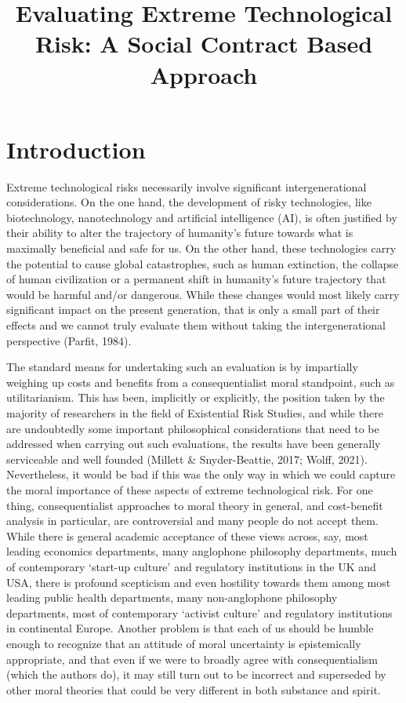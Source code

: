 \documentclass[man,11pt,a4paper]{apa7}
\title{Evaluating Extreme Technological Risk: A Social Contract Based Approach}
\begin{document}
\maketitle
\makeatletter
\renewcommand\@makefntext[1]{\linespread{1}\selectfont\raggedright\textsuperscript{\@thefnmark}~#1}
\makeatother

\section{Introduction}

Extreme technological risks necessarily involve significant intergenerational considerations. On the one hand, the development of risky technologies, like biotechnology, nanotechnology and artificial intelligence (AI), is often justified by their ability to alter the trajectory of humanity's future towards what is maximally beneficial and safe for us. On the other hand, these technologies carry the potential to cause global catastrophes, such as human extinction, the collapse of human civilization or a permanent shift in humanity's future trajectory that would be harmful and/or dangerous. While these changes would most likely carry significant impact on the present generation, that is only a small part of their effects and we cannot truly evaluate them without taking the intergenerational perspective (Parfit, 1984).

The standard means for undertaking such an evaluation is by impartially weighing up costs and benefits from a consequentialist moral standpoint, such as utilitarianism. This has been, implicitly or explicitly, the position taken by the majority of researchers in the field of Existential Risk Studies, and while there are undoubtedly some important philosophical considerations that need to be addressed when carrying out such evaluations, the results have been generally serviceable and well founded (Millett \& Snyder-Beattie, 2017; Wolff, 2021). Nevertheless, it would be bad if this was the only way in which we could capture the moral importance of these aspects of extreme technological risk. For one thing, consequentialist approaches to moral theory in general, and cost-benefit analysis in particular, are controversial and many people do not accept them. While there is general academic acceptance of these views across, say, most leading economics departments, many anglophone philosophy departments, much of contemporary `start-up culture' and regulatory institutions in the UK and USA, there is profound scepticism and even hostility towards them among most leading public health departments, many non-anglophone philosophy departments, most of contemporary `activist culture' and regulatory institutions in continental Europe. Another problem is that each of us should be humble enough to recognize that an attitude of moral uncertainty is epistemically appropriate, and that even if we were to broadly agree with consequentialism (which the authors do), it may still turn out to be incorrect and superseded by other moral theories that could be very different in both substance and spirit.
\end{document}
